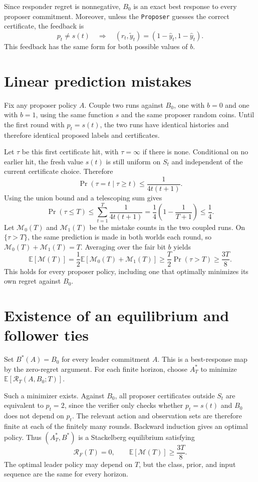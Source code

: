 \documentclass[11pt]{article}
\renewcommand{\Re}{\mathcal R}
\newcommand{\Mi}{\mathcal M}
\newcommand{\hy}{\hat y}
\newcommand{\vy}{\tilde y}
\newcommand{\dt}{\texttt{Proposer}\xspace}
\begin{document}
Since responder regret is nonnegative, $B_0$ is an exact best response to
every proposer commitment. Moreover, unless the \dt guesses the correct
certificate, the feedback is
\[
p_t\ne s(t)
\quad\Longrightarrow\quad
(r_t,\vy_t)=(1-\hy_t,1-\hy_t).
\]
This feedback has the same form for both possible values of $b$.

\section{Linear prediction mistakes}

Fix any proposer policy $A$. Couple two runs against $B_0$, one with $b=0$
and one with $b=1$, using the same function $s$ and the same proposer
random coins. Until the first round with $p_t=s(t)$, the two runs have
identical histories and therefore identical proposed labels and
certificates.

Let $\tau$ be this first certificate hit, with $\tau=\infty$ if there is
none. Conditional on no earlier hit, the fresh value $s(t)$ is still
uniform on $S_t$ and independent of the current certificate choice.
Therefore
\[
\Pr(\tau=t\mid\tau\ge t)\le\frac{1}{4t(t+1)}.
\]
Using the union bound and a telescoping sum gives
\[
\Pr(\tau\le T)
\le\sum_{t=1}^T\frac{1}{4t(t+1)}
=\frac14\left(1-\frac{1}{T+1}\right)
\le\frac14.
\]
Let $\Mi_0(T)$ and $\Mi_1(T)$ be the mistake counts in the two coupled
runs. On $\{\tau>T\}$, the same prediction is made in both worlds each
round, so $\Mi_0(T)+\Mi_1(T)=T$. Averaging over the fair bit $b$ yields
\[
\mathbb E[\Mi(T)]
=\frac12\mathbb E[\Mi_0(T)+\Mi_1(T)]
\ge\frac T2\Pr(\tau>T)
\ge\frac{3T}{8}.
\]
This holds for every proposer policy, including one that optimally
minimizes its own regret against $B_0$.

\section{Existence of an equilibrium and follower ties}

Set $B^*(A)=B_0$ for every leader commitment $A$. This is a best-response
map by the zero-regret argument. For each finite horizon, choose $A_T^*$
to minimize $\mathbb E[\Re_T(A,B_0;T)]$.

Such a minimizer exists. Against $B_0$, all proposer certificates outside
$S_t$ are equivalent to $p_t=2$, since the verifier only checks whether
$p_t=s(t)$ and $B_0$ does not depend on $p_t$. The relevant action and
observation sets are therefore finite at each of the finitely many
rounds. Backward induction gives an optimal policy. Thus
$(A_T^*,B^*)$ is a Stackelberg equilibrium satisfying
\[
\Re_F(T)=0,
\qquad
\mathbb E[\Mi(T)]\ge\frac{3T}{8}.
\]
The optimal leader policy may depend on $T$, but the class, prior, and
input sequence are the same for every horizon.
\end{document}
